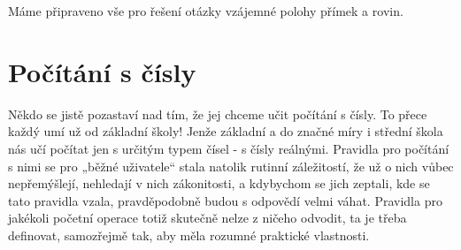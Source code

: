       
      
      
  
      Máme připraveno vše pro řešení otázky vzájemné polohy přímek a rovin.

      

      
      
      
      
  \section{Počítání s čísly}\label{mai:IchapIIsecII}
    Někdo se jistě pozastaví nad tím, že jej chceme učit počítání s čísly. To přece každý umí
    už od základní školy! Jenže základní a do značné míry i střední škola nás učí počítat jen
    s určitým typem čísel - s čísly reálnými. Pravidla pro počítání s nimi se pro „běžné uživatele“
    stala natolik rutinní záležitostí, že už o nich vůbec nepřemýšlejí, nehledají v nich 
    zákonitosti, a kdybychom se jich zeptali, kde se tato pravidla vzala, pravděpodobně budou s 
    odpovědí velmi váhat. Pravidla pro jakékoli početní operace totiž skutečně nelze z ničeho 
    odvodit, ta je třeba definovat, samozřejmě tak, aby měla rozumné praktické vlastnosti.
    
